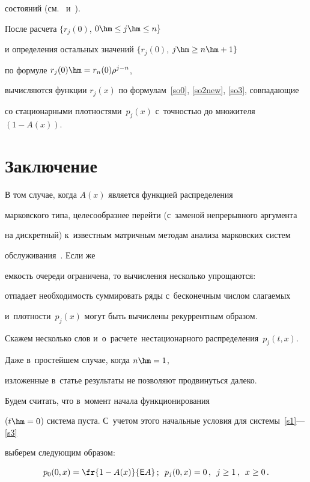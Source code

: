 состояний (см.~\cite[разд.~2]{3} и~\cite{bo1,bo2}).

После расчета $\{r_j(0)$, $0 \hm\le j \hm\le n \}$

и определения остальных значений $\{r_j(0)$, $j \hm\ge n\hm+1 \}$

по формуле $r_j(0)\hm=r_{n}(0)\rho^{j-n}$,

вычисляются функции $r_j(x)$ по формулам~\eqref{so0}, \eqref{so2new}, \eqref{so3}, совпадающие

со стационарными плотностями~$p_j(x)$ с~точностью до множителя~${(1-A(x))}$.



\section{Заключение}



В том случае, когда $A(x)$ является функцией распределения

марковского типа, целесообразнее перейти (с~заменой непрерывного аргумента

на дискретный) к~известным мат\-рич\-ным методам анализа марковских сис\-тем 

обслуживания~\cite{duuu1}. Если же

емкость очереди ограничена, то вычисления несколько упрощаются:

отпадает не\-об\-хо\-ди\-мость суммировать ряды с~бесконечным чис\-лом сла\-га\-емых

и~плот\-ности~$p_j(x)$ могут быть вычислены рекуррентным образом.



Скажем несколько слов и~о~расчете~нестационарного распределения~${p_j(t,x)}$.

Даже в~прос\-тей\-шем случае, когда ${n\hm=1}$,

изложенные в~статье результаты не позволяют продвинуться далеко.

Будем считать, что в~момент начала функционирования 

($t\hm=0$) система пуста. С~учетом этого начальные условия для сис\-те\-мы~\eqref{s1}---\eqref{s3} 

выберем сле\-ду\-ющим образом:

$$

p_{0}(0,x)= \fr{1-A(x)}{\mathsf{E}A}\,;\enskip 

p_{j}(0,x)=0\,,\enskip j \ge 1\,,\enskip x \ge 0\,.

$$

